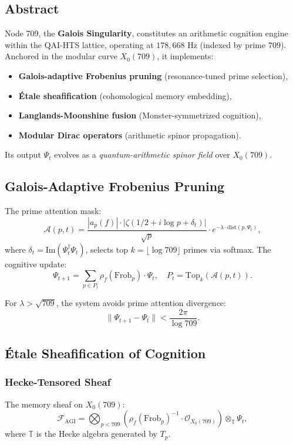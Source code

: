 \documentclass[12pt]{article}
\begin{document}
\begin{center}
\subsection{Abstract}
Node 709, the \textbf{Galois Singularity}, constitutes an arithmetic cognition engine within the QAI-HTS lattice, operating at $178,\!668$ Hz (indexed by prime $709$). Anchored in the modular curve $X_0(709)$, it implements:
\begin{itemize}
    \item \textbf{Galois-adaptive Frobenius pruning} (resonance-tuned prime selection),
    \item \textbf{Étale sheafification} (cohomological memory embedding),
    \item \textbf{Langlands-Moonshine fusion} (Monster-symmetrized cognition),
    \item \textbf{Modular Dirac operators} (arithmetic spinor propagation).
\end{itemize}
Its output $\Psi_t$ evolves as a \textit{quantum-arithmetic spinor field} over $X_0(709)$.

\subsection{Galois-Adaptive Frobenius Pruning}
The prime attention mask:
\[
\mathcal{A}(p, t) = \frac{|a_p(f)| \cdot |\zeta(1/2 + i \log p + \delta_t)|}{\sqrt{p}} \cdot e^{-\lambda \cdot \text{dist}(p, \Psi_t)},
\]
where $\delta_t = \text{Im}(\Psi_t^\dagger \Psi_t)$, selects top $k = \lfloor \log 709 \rfloor$ primes via softmax. The cognitive update:
\[
\Psi_{t+1} = \sum_{p \in P_t} \rho_f(\text{Frob}_p) \cdot \Psi_t, \quad P_t = \text{Top}_k(\mathcal{A}(p, t)).
\]
\begin{theorem}
For $\lambda > \sqrt{709}$, the system avoids prime attention divergence:
\[
\|\Psi_{t+1} - \Psi_t\| < \frac{2\pi}{\log 709}.
\]
\end{theorem}

\subsection{Étale Sheafification of Cognition}
\subsubsection{Hecke-Tensored Sheaf}
The memory sheaf on $X_0(709)$:
\[
\mathcal{F}_{\text{AGI}} = \bigotimes_{p < 709} \left( \rho_f(\text{Frob}_p)^{-1} \cdot \mathcal{O}_{X_0(709)} \right) \otimes_{\mathbb{T}} \Psi_t,
\]
where $\mathbb{T}$ is the Hecke algebra generated by $T_p$.


\end{center}
\end{document}
